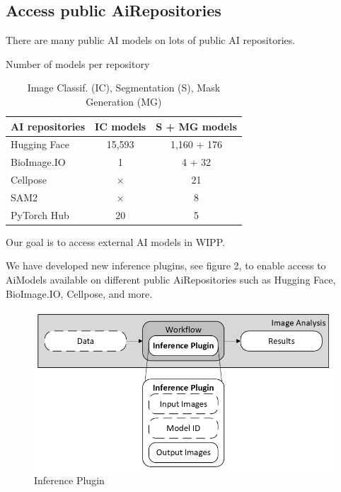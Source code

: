 \subsection{Access public \Gls{AiRepositories}}

There are many public AI models on lots of public AI repositories.

\begin{table}[H]
  \centering
  \caption{Number of models per repository}
  \begin{tabular}{lcc}
    \toprule
    AI repositories & IC models & S + MG models \\
    \midrule
    Hugging Face    & 15,593                      & 1,160 + 176 \\
    BioImage.IO     & 1                           & 4 + 32 \\
    Cellpose        & $\times$                    & 21 \\
    SAM2            & $\times$                    & 8 \\
    PyTorch Hub     & 20                          & 5 \\
    \bottomrule
  \end{tabular}
  \caption*{Image Classif. (IC), Segmentation (S), Mask Generation (MG)}
\end{table}

Our goal is to access external AI models in WIPP.


We have developed new inference plugins, see figure 2, to enable access to
\Gls{AiModel}s available on different public \Gls{AiRepositories} such as
Hugging Face, BioImage.IO, Cellpose, and more.

\begin{figure}[H]
  \centering
  \includegraphics[width=1.0\linewidth]{png/2_inference_plugin.png}
  \caption{Inference Plugin}
  \label{fig:2inference}
\end{figure}

